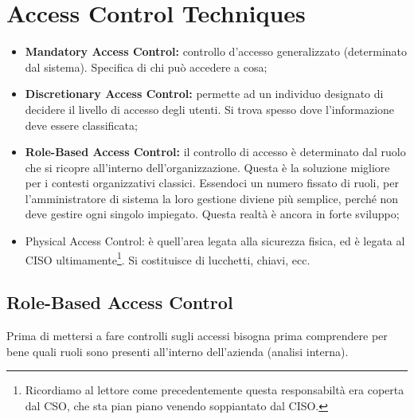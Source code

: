 \chapter{Access Control Techniques}
\label{AccessControlTechniques}
\begin{itemize}
 \item \textbf{Mandatory Access Control:} controllo d'accesso generalizzato 
 (determinato dal sistema). Specifica di chi può accedere a cosa;
 \item \textbf{Discretionary Access Control:} permette ad un individuo
 designato di decidere il livello di accesso degli utenti.
 Si trova spesso dove l'informazione deve essere classificata;
 \item \textbf{Role-Based Access Control:} il controllo di accesso è
 determinato dal ruolo che si ricopre all'interno dell'organizzazione.
 Questa è la soluzione migliore per i contesti
 organizzativi classici. Essendoci un numero fissato di ruoli, per
 l'amministratore di sistema la loro gestione diviene più semplice, 
 perché non deve gestire ogni singolo impiegato. 
 Questa realtà è ancora in forte sviluppo;
 \item Physical Access Control: è quell’area legata alla sicurezza 
 fisica, ed è legata al CISO ultimamente\footnote{Ricordiamo al lettore
 come precedentemente questa responsabiltà era coperta dal CSO, che sta
 pian piano venendo soppiantato dal CISO.}. Si costituisce di lucchetti,
 chiavi, ecc.

\end{itemize}


\section{Role-Based Access Control}

Prima di mettersi a fare controlli sugli accessi bisogna prima comprendere per
bene quali ruoli sono presenti all'interno dell'azienda (analisi interna).

\begin{table}[H]
\centering
{}
\caption{Un esempio di un \textit{Role-Based Access Control}}
\end{table}



